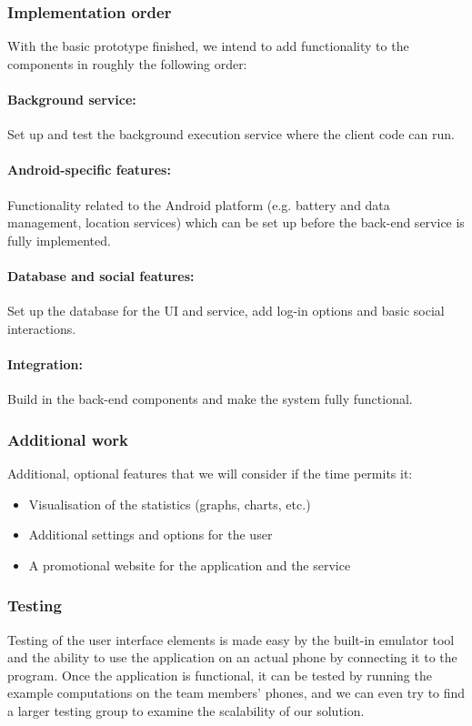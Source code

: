 \documentclass[
  twoside,
  10pt, a4paper
]{article}
\begin{document}
\subsubsection{Implementation order}
With the basic prototype finished, we intend to add functionality to the components in roughly the following order:
\paragraph{Background service: } Set up and test the background execution service where the client code can run.
\paragraph{Android-specific features: } Functionality related to the Android platform (e.g. battery and data management, location services) which can be set up before the back-end service is fully implemented.
\paragraph{Database and social features: } Set up the database for the UI and service, add log-in options and basic social interactions.
\paragraph{Integration: } Build in the back-end components and make the system fully functional.

\subsubsection{Additional work} 
Additional, optional features that we will consider if the time permits it:
\begin{itemize}
    \item Visualisation of the statistics (graphs, charts, etc.)
    \item Additional settings and options for the user
    \item A promotional website for the application and the service
\end{itemize}

\subsubsection{Testing}
Testing of the user interface elements is made easy by the built-in emulator tool and the ability to use the application on an actual phone by connecting it to the program. Once the application is functional, it can be tested by running the example computations on the team members' phones, and we can even try to find a larger testing group to examine the scalability of our solution.
\end{document}
